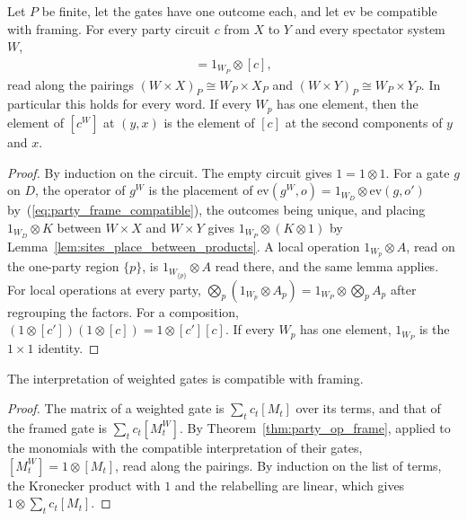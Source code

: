 \begin{theorem}
    \label{thm:party_op_frame}
    \leanok
    Let $P$ be finite, let the gates have one outcome each, and let $\mathrm{ev}$ be
    compatible with framing. For every party circuit $c$ from $X$ to $Y$ and every
    spectator system $W$,
    \begin{align}
        [c^W]=1_{W_P}\otimes[c],
        \label{eq:party_op_frame}
    \end{align}
    read along the pairings $(W\times X)_P\cong W_P\times X_P$ and
    $(W\times Y)_P\cong W_P\times Y_P$. In particular this holds for every word.
    If every $W_p$ has one element, then the element of $[c^W]$ at $(y,x)$ is the
    element of $[c]$ at the second components of $y$ and $x$.
\end{theorem}
\begin{proof}\leanok
    By induction on the circuit. The empty circuit gives $1=1\otimes1$. For a gate
    $g$ on $D$, the operator of $g^W$ is the placement of
    $\mathrm{ev}(g^W,o)=1_{W_D}\otimes\mathrm{ev}(g,o')$
    by~(\ref{eq:party_frame_compatible}), the outcomes being unique, and placing
    $1_{W_D}\otimes K$ between $W\times X$ and $W\times Y$ gives
    $1_{W_P}\otimes(K\otimes1)$ by Lemma~\ref{lem:sites_place_between_products}. A
    local operation $1_{W_p}\otimes A$, read on the one-party region $\{p\}$, is
    $1_{W_{\{p\}}}\otimes A$ read there, and the same lemma applies. For local
    operations at every party, $\bigotimes_p(1_{W_p}\otimes A_p)
        =1_{W_P}\otimes\bigotimes_pA_p$ after regrouping the factors. For a
    composition, $(1\otimes[c'])(1\otimes[c])=1\otimes[c'][c]$. If every $W_p$ has
    one element, $1_{W_P}$ is the $1\times1$ identity.
\end{proof}

\begin{theorem}
    \label{thm:party_frame_weighted}
    \leanok
    The interpretation of weighted gates is compatible with framing.
\end{theorem}
\begin{proof}\leanok
    The matrix of a weighted gate is $\sum_tc_t[M_t]$ over its terms, and that of the
    framed gate is $\sum_tc_t[M_t^W]$. By Theorem~\ref{thm:party_op_frame}, applied
    to the monomials with the compatible interpretation of their gates,
    $[M_t^W]=1\otimes[M_t]$, read along the pairings. By induction on the list of
    terms, the Kronecker product with $1$ and the relabelling are linear, which
    gives $1\otimes\sum_tc_t[M_t]$.
\end{proof}

